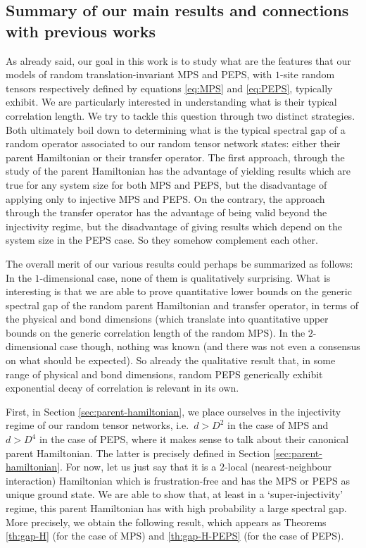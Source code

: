 \documentclass{amsart}
\begin{document}
\subsection{Summary of our main results and connections with previous works} \hfill\par\smallskip

As already said, our goal in this work is to study what are the features that our models of random translation-invariant MPS and PEPS, with $1$-site random tensors respectively defined by equations \eqref{eq:MPS} and \eqref{eq:PEPS}, typically exhibit. We are particularly interested in understanding what is their typical correlation length. We try to tackle this question through two distinct strategies. Both ultimately boil down to determining what is the typical spectral gap of a random operator associated to our random tensor network states: either their parent Hamiltonian or their transfer operator. The first approach, through the study of the parent Hamiltonian has the advantage of yielding results which are true for any system size for both MPS and PEPS, but the disadvantage of applying only to injective MPS and PEPS. On the contrary, the approach through the transfer operator has the advantage of being valid beyond the injectivity regime, but the disadvantage of giving results which depend on the system size in the PEPS case. So they somehow complement each other.

The overall merit of our various results could perhaps be summarized as follows: In the $1$-dimensional case, none of them is qualitatively surprising. What is interesting is that we are able to prove quantitative lower bounds on the generic spectral gap of the random parent Hamiltonian and transfer operator, in terms of the physical and bond dimensions (which translate into quantitative upper bounds on the generic correlation length of the random MPS). In the $2$-dimensional case though, nothing was known (and there was not even a consensus on what should be expected). So already the qualitative result that, in some range of physical and bond dimensions, random PEPS generically exhibit exponential decay of correlation is relevant in its own.

First, in Section \ref{sec:parent-hamiltonian}, we place ourselves in the injectivity regime of our random tensor networks, i.e.~$d>D^2$ in the case of MPS and $d>D^4$ in the case of PEPS, where it makes sense to talk about their canonical parent Hamiltonian. The latter is precisely defined in Section \ref{sec:parent-hamiltonian}. For now, let us just say that it is a $2$-local (nearest-neighbour interaction) Hamiltonian which is frustration-free and has the MPS or PEPS as unique ground state. We are able to show that, at least in a `super-injectivity' regime, this parent Hamiltonian has with high probability a large spectral gap. More precisely, we obtain the following result, which appears as Theorems \ref{th:gap-H} (for the case of MPS) and \ref{th:gap-H-PEPS} (for the case of PEPS).
\end{document}
